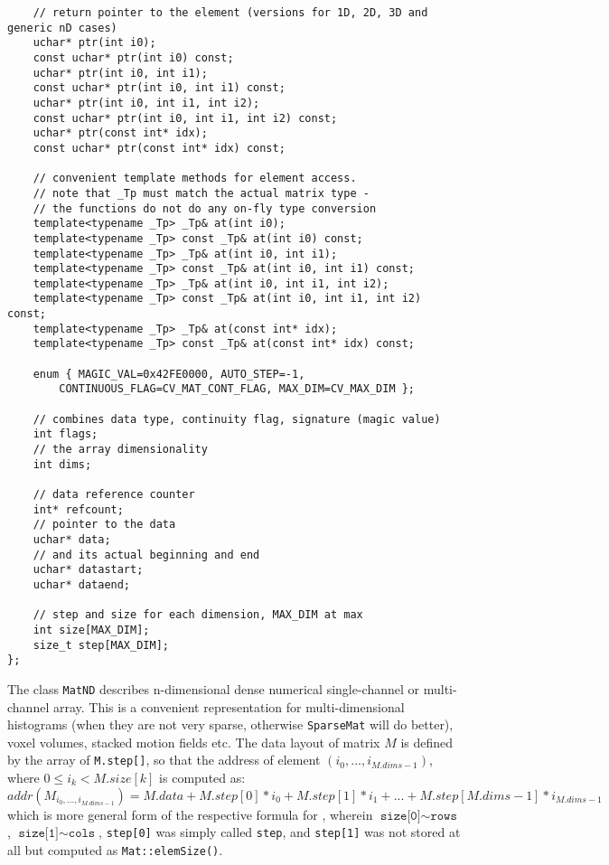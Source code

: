 \begin{lstlisting}
    // return pointer to the element (versions for 1D, 2D, 3D and generic nD cases)
    uchar* ptr(int i0);
    const uchar* ptr(int i0) const;
    uchar* ptr(int i0, int i1);
    const uchar* ptr(int i0, int i1) const;
    uchar* ptr(int i0, int i1, int i2);
    const uchar* ptr(int i0, int i1, int i2) const;
    uchar* ptr(const int* idx);
    const uchar* ptr(const int* idx) const;

    // convenient template methods for element access.
    // note that _Tp must match the actual matrix type -
    // the functions do not do any on-fly type conversion
    template<typename _Tp> _Tp& at(int i0);
    template<typename _Tp> const _Tp& at(int i0) const;
    template<typename _Tp> _Tp& at(int i0, int i1);
    template<typename _Tp> const _Tp& at(int i0, int i1) const;
    template<typename _Tp> _Tp& at(int i0, int i1, int i2);
    template<typename _Tp> const _Tp& at(int i0, int i1, int i2) const;
    template<typename _Tp> _Tp& at(const int* idx);
    template<typename _Tp> const _Tp& at(const int* idx) const;

    enum { MAGIC_VAL=0x42FE0000, AUTO_STEP=-1,
        CONTINUOUS_FLAG=CV_MAT_CONT_FLAG, MAX_DIM=CV_MAX_DIM };

    // combines data type, continuity flag, signature (magic value) 
    int flags;
    // the array dimensionality
    int dims;

    // data reference counter
    int* refcount;
    // pointer to the data
    uchar* data;
    // and its actual beginning and end
    uchar* datastart;
    uchar* dataend;

    // step and size for each dimension, MAX_DIM at max
    int size[MAX_DIM];
    size_t step[MAX_DIM];
};
\end{lstlisting}

The class \texttt{MatND} describes n-dimensional dense numerical single-channel or multi-channel array. This is a convenient representation for multi-dimensional histograms (when they are not very sparse, otherwise \texttt{SparseMat} will do better), voxel volumes, stacked motion fields etc. The data layout of matrix $M$ is defined by the array of \texttt{M.step[]}, so that the address of element $(i_0,...,i_{M.dims-1})$, where $0\leq i_k<M.size[k]$ is computed as:
\[
addr(M_{i_0,...,i_{M.dims-1}}) = M.data + M.step[0]*i_0 + M.step[1]*i_1 + ... + M.step[M.dims-1]*i_{M.dims-1}
\]
which is more general form of the respective formula for , wherein $\texttt{size[0]}\sim\texttt{rows}$,
$\texttt{size[1]}\sim\texttt{cols}$, \texttt{step[0]} was simply called \texttt{step}, and \texttt{step[1]} was not stored at all but computed as \texttt{Mat::elemSize()}.

